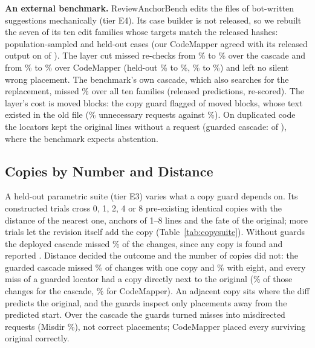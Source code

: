 \textbf{An external benchmark.}\label{sec:rabv12} ReviewAnchorBench \cite{fu2026reviewanchorbench} edits the files of bot-written suggestions mechanically (tier E4). Its case builder is not released, so we rebuilt the seven of its ten edit families whose targets match the released hashes: \wrPopCases{} population-sampled and \wrHardCases{} held-out cases (our CodeMapper agreed with its released output on \wrCmAgreeK{} of \wrCmAgreeN). The layer cut missed re-checks from \wrPopDepMiss\% to \wrPopGiMiss\% over the cascade and from \wrPopCmQMiss\% to \wrPopCmGiMiss\% over CodeMapper (held-out \wrHardDepMiss\% to \wrHardGiMiss\%, \wrHardCmQMiss\% to \wrHardCmGiMiss\%) and left no silent wrong placement. The benchmark's own cascade, which also searches for the replacement, missed \wrPopRabTenMiss\% over all ten families (released predictions, re-scored). The layer's cost is moved blocks: the copy guard flagged \wrPopGiMoveCopyReq{} of \wrPopGiMoveN{} moved blocks, whose text existed in the old file (\wrPopGiExtra\% unnecessary requests against \wrPopRabExtra\%). On duplicated code the locators kept the original lines without a request (guarded cascade: \wrPopGiDupOrig{} of \wrPopAnchors), where the benchmark expects abstention.



\subsection{Copies by Number and Distance}\label{sec:copysuite}
A held-out parametric suite (tier E3) varies what a copy guard depends on. Its \wpNMain{} constructed trials cross 0, 1, 2, 4 or 8 pre-existing identical copies with the distance of the nearest one, anchors of 1--8 lines and the fate of the original; \wpNSame{} more trials let the revision itself add the copy (Table~\ref{tab:copysuite}). Without guards the deployed cascade missed \wpDepMiss\% of the changes, since any copy is found and reported . Distance decided the outcome and the number of copies did not: the guarded cascade missed \wpGiCOneMiss\% of changes with one copy and \wpGiCEightMiss\% with eight, and every miss of a guarded locator had a copy directly next to the original (\wpGiDAdjMiss\% of those changes for the cascade, \wpCmGiDAdjMiss\% for CodeMapper). An adjacent copy sits where the diff predicts the original, and the guards inspect only placements away from the predicted start. Over the cascade the guards turned misses into misdirected requests (Misdir \wpGiMisdir\%), not correct placements; CodeMapper placed every surviving original correctly.

